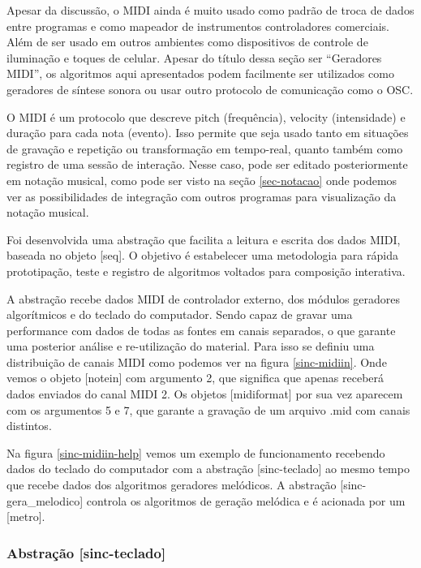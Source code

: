 \documentclass{ppgmus}
\begin{document}
Apesar da discussão, o MIDI ainda é muito usado como padrão de troca de dados entre programas e 
como mapeador de instrumentos controladores comerciais. Além de ser usado em outros ambientes
como dispositivos de controle de iluminação e toques de celular. Apesar do título dessa seção
ser ``Geradores MIDI'', os algoritmos aqui apresentados podem facilmente ser utilizados como
geradores de síntese sonora ou usar outro protocolo de comunicação como o OSC.

O MIDI é um protocolo que descreve pitch (frequência), velocity (intensidade) e duração para cada
nota (evento). Isso permite que seja usado tanto em situações de gravação e repetição ou
transformação em tempo-real, quanto também como registro de uma sessão de interação.
Nesse caso, pode ser editado posteriormente em notação musical, como pode ser
visto na seção \ref{sec-notacao} onde podemos ver as possibilidades de integração
com outros programas para visualização da notação musical.

Foi desenvolvida uma abstração que facilita a leitura e escrita dos dados MIDI, baseada no
objeto [seq]. O objetivo é estabelecer uma metodologia para rápida prototipação, teste e registro
de algoritmos voltados para composição interativa.

A abstração recebe dados MIDI de controlador externo, dos módulos geradores algorítmicos e do
teclado do computador. Sendo capaz de gravar uma performance com dados de todas as fontes em
canais separados, o que garante uma posterior análise e re-utilização do material. Para isso
se definiu uma distribuição de canais MIDI como podemos ver na figura \ref{sinc-midiin}. Onde vemos
o objeto [notein] com argumento 2, que significa que apenas receberá dados enviados do canal MIDI 2.
Os objetos [midiformat] por sua vez aparecem com os argumentos 5 e 7, que garante a gravação
de um arquivo .mid com canais distintos.


Na figura \ref{sinc-midiin-help} vemos um exemplo de funcionamento recebendo dados do teclado do
computador com a abstração [sinc-teclado] ao mesmo tempo que recebe dados dos algoritmos geradores
melódicos. A abstração [sinc-gera\_melodico] controla os algoritmos de geração melódica e é acionada
por um [metro]. 


\subsubsection{Abstração [sinc-teclado]}


\end{document}
